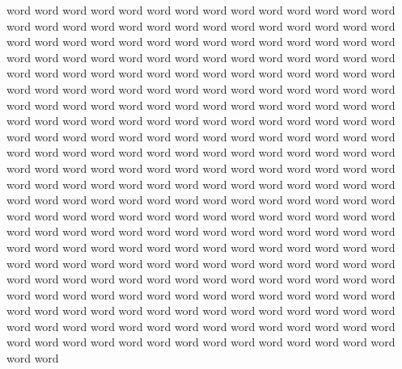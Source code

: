 word word word word word word word word word word word word word word word word word word word word word word word word word word word word word word word word word word word word word word word word word word word word word word word word word word word word word word word word word word word word word word word word word word word word word word word word word word word word word word word word word word word word word word word word word word word word word word word word word word word word word word word word word word word word word word word word word word word word word word word word word word word word word word word word word word word word word word word word word word word word word word word word word word word word word word word word word word word word word word word word word word word word word word word word word word word word word word word word word word word word word word word word word word word word word word word word word word word word word word word word word word word word word word word word word word word word word word word word word word word word word word word word word word word word word word word word word word word word word word word word word word word word word word word word word word word word word word word word word word word word word word word word word word word word word word word word word word word word word word word word word word word word word word word word word word word word word word word word word word word word word word word word word word word word word word
